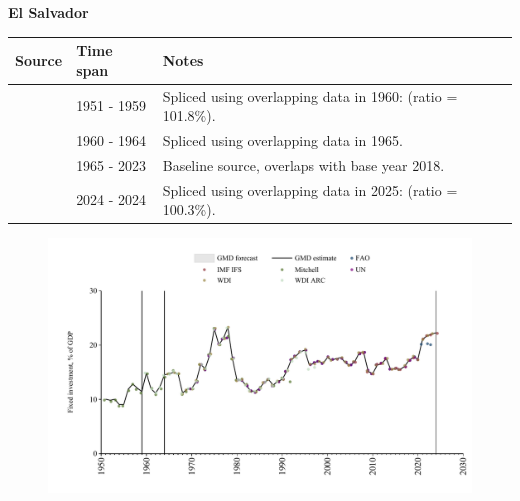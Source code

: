 \documentclass[12pt,a4paper,landscape]{article}
\begin{document}
\begin{adjustbox}{max totalsize={\paperwidth}{\paperheight},center}
\begin{minipage}[t][\textheight][t]{\textwidth}
\vspace*{0.5cm}
{}
\begin{center}
{\Large\bfseries El Salvador}
\end{center}
\vspace{0.5cm}
\begin{table}[H]
\centering
\small
\begin{tabular}{|l|l|l|}
\hline
\textbf{Source} & \textbf{Time span} & \textbf{Notes} \\
\hline
\rowcolor{white}\cite{Mitchell}& 1951 - 1959 &Spliced using overlapping data in 1960: (ratio = 101.8\%).\\
\rowcolor{lightgray}\cite{WDI_ARC}& 1960 - 1964 &Spliced using overlapping data in 1965.\\
\rowcolor{white}\cite{WDI}& 1965 - 2023 &Baseline source, overlaps with base year 2018.\\
\rowcolor{lightgray}\cite{IMF_IFS}& 2024 - 2024 &Spliced using overlapping data in 2025: (ratio = 100.3\%).\\
\hline
\end{tabular}
\end{table}
\begin{figure}[H]
\centering
\includegraphics[width=\textwidth,height=0.6\textheight,keepaspectratio]{graphs/SLV_finv_GDP.pdf}
\end{figure}
\end{minipage}
\end{adjustbox}
\end{document}
